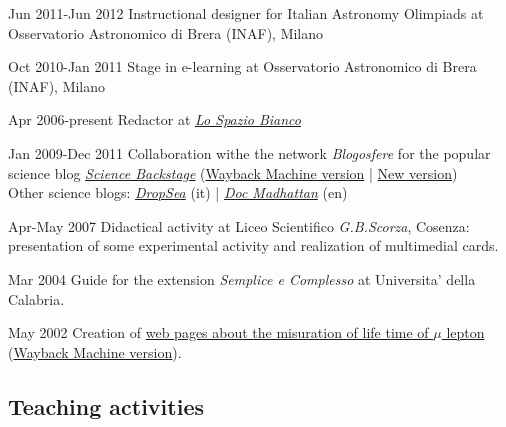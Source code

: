 \begin{CV}
\item[Jun 2011-Jun 2012] Instructional designer for Italian Astronomy Olimpiads at Osservatorio Astronomico di Brera (INAF), Milano

\item[Oct 2010-Jan 2011] Stage in e-learning at Osservatorio Astronomico di Brera (INAF), Milano

\item[Apr 2006-present] Redactor at \href{http://www.lospaziobianco.it/}{\em Lo Spazio Bianco}

\item[Jan 2009-Dec 2011] Collaboration withe the network {\em Blogosfere} for the popular science blog \href{http://sciencebackstage.blogosfere.it/}{\em Science Backstage} (\href{https://web.archive.org/web/20111211024053/http://sciencebackstage.blogosfere.it/}{Wayback Machine version} | \href{http://sciencebackstage.blogspot.it/}{New version})\\
Other science blogs: \href{http://dropseaofulaula.blogspot.com/}{\em DropSea} (it) | \href{http://docmadhattan.fieldofscience.com/}{\em Doc Madhattan} (en)

\item[Apr-May 2007] Didactical activity at Liceo Scientifico {\em G.B.Scorza}, Cosenza: presentation of some experimental activity and realization of multimedial cards.

\item[Mar 2004] Guide for the extension {\em Semplice e Complesso} at Universita' della Calabria.

\item[May 2002] Creation of \href{http://www.fis.unical.it/gruppi/alteenergie/}{web pages  about the misuration of life time of $\mu$ lepton} (\href{http://web.archive.org/web/20070207064033/http://www.fis.unical.it/gruppi/alteenergie/}{Wayback Machine version}).

\end{CV}

\subsection*{Teaching activities}

